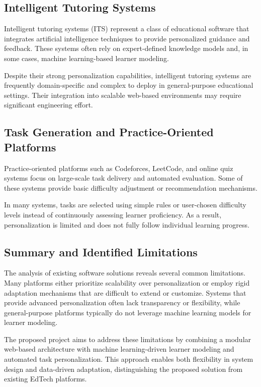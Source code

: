 \documentclass[a4paper,12pt]{extarticle}
\begin{document}
\subsection{Intelligent Tutoring Systems}

Intelligent tutoring systems (ITS) represent a class of educational software that integrates artificial intelligence techniques to provide personalized guidance and feedback. These systems often rely on expert-defined knowledge models and, in some cases, machine learning-based learner modeling.

Despite their strong personalization capabilities, intelligent tutoring systems are frequently domain-specific and complex to deploy in general-purpose educational settings. Their integration into scalable web-based environments may require significant engineering effort.

\subsection{Task Generation and Practice-Oriented Platforms}

Practice-oriented platforms such as Codeforces, LeetCode, and online quiz systems focus on large-scale task delivery and automated evaluation. Some of these systems provide basic difficulty adjustment or recommendation mechanisms.

In many systems, tasks are selected using simple rules or user-chosen difficulty levels instead of continuously assessing learner proficiency. As a result, personalization is limited and does not fully follow individual learning progress.

\subsection{Summary and Identified Limitations}

The analysis of existing software solutions reveals several common limitations. Many platforms either prioritize scalability over personalization or employ rigid adaptation mechanisms that are difficult to extend or customize. Systems that provide advanced personalization often lack transparency or flexibility, while general-purpose platforms typically do not leverage machine learning models for learner modeling.

The proposed project aims to address these limitations by combining a modular web-based architecture with machine learning-driven learner modeling and automated task personalization. This approach enables both flexibility in system design and data-driven adaptation, distinguishing the proposed solution from existing EdTech platforms.
\end{document}
